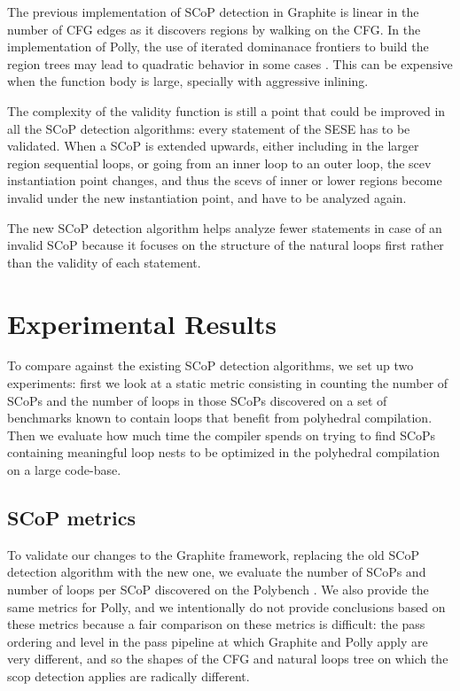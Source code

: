 \documentclass{sigplanconf}
\begin{document}
The previous implementation of SCoP detection in Graphite is linear in the
number of CFG edges as it discovers regions by walking on the CFG.  In the
implementation of Polly, the use of iterated dominanace frontiers to build the
region trees may lead to quadratic behavior in some cases \cite{ramalingam}.
This can be expensive when the function body is large, specially with aggressive
inlining.

The complexity of the validity function is still a point that could be improved
in all the SCoP detection algorithms: every statement of the SESE has to be
validated.  When a SCoP is extended upwards, either including in the larger
region sequential loops, or going from an inner loop to an outer loop, the scev
instantiation point changes, and thus the scevs of inner or lower regions become
invalid under the new instantiation point, and have to be analyzed again.

The new SCoP detection algorithm helps analyze fewer statements in case of an
invalid SCoP because it focuses on the structure of the natural loops first
rather than the validity of each statement.

\section{Experimental Results}

To compare against the existing SCoP detection algorithms, we set up two
experiments: first we look at a static metric consisting in counting the number
of SCoPs and the number of loops in those SCoPs discovered on a set of
benchmarks known to contain loops that benefit from polyhedral compilation.
Then we evaluate how much time the compiler spends on trying to find SCoPs
containing meaningful loop nests to be optimized in the polyhedral compilation
on a large code-base.

\subsection{SCoP metrics}
To validate our changes to the Graphite framework, replacing the old SCoP
detection algorithm with the new one, we evaluate the number of SCoPs and number
of loops per SCoP discovered on the Polybench \cite{polybench}.  We also provide
the same metrics for Polly, and we intentionally do not provide conclusions
based on these metrics because a fair comparison on these metrics is difficult:
the pass ordering and level in the pass pipeline at which Graphite and Polly
apply are very different, and so the shapes of the CFG and natural loops tree on
which the scop detection applies are radically different.
\end{document}
